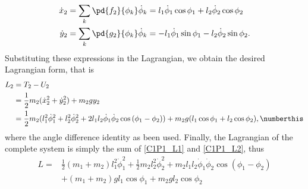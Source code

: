 \begin{problem}
{\begin{align*}
    \Dot{x}_2 &= \sum_k \pd{f_2}{\phi_k} \Dot{\phi}_k = l_1 \Dot{\phi}_1 \cos{\phi_1} + l_2 \Dot{\phi}_2 \cos{\phi_2} \\
    \Dot{y}_2 &= \sum_k \pd{g_2}{\phi_k} \Dot{\phi}_k = -l_1 \Dot{\phi}_1 \sin{\phi_1} -l_2 \Dot{\phi}_2 \sin{\phi_2} .
\end{align*}
Substituting these expressions in the Lagrangian, we obtain the desired Lagrangian form, that is
\begin{align*}
    L_2 &= T_2 - U_2 \\
    &= \frac{1}{2} m_2 (\Dot{x}_2^2 + \Dot{y}_2^2) + m_2 g y_2 \\
    &= \frac{1}{2} m_2 (l_1^2\Dot{\phi}_1^2 + l_2^2\Dot{\phi}_2^2 + 2l_1l_2\Dot{\phi}_1\Dot{\phi}_2\cos{(\phi_1 - \phi_2)}) + m_2 g (l_1 \cos{\phi_1} + l_2 \cos{\phi_2}) , \numberthis \label{C1P1_L2}
\end{align*}
where the angle difference identity as been used. Finally, the Lagrangian of the complete system is simply the sum of \eqref{C1P1_L1} and \eqref{C1P1_L2}, thus
}
{
\begin{align*}
    L = &\frac{1}{2}(m_1+m_2)l_1^2\Dot{\phi}_1^2 + \frac{1}{2}m_2l_2^2\Dot{\phi}_2^2 + m_2l_1l_2\Dot{\phi}_1\Dot{\phi}_2\cos{(\phi_1-\phi_2)} \\
    &+ (m_1+m_2)gl_1\cos{\phi_1} + m_2gl_2\cos{\phi_2}
\end{align*}
}
\end{problem}


